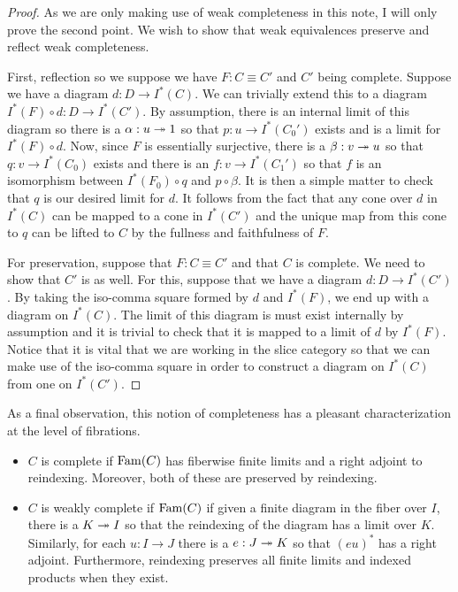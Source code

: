 \begin{proof}
  As we are only making use of weak completeness in this note, I will
  only prove the second point. We wish to show that weak equivalences
  preserve and reflect weak completeness.

  First, reflection so we suppose we have $F : C \equiv C'$ and $C'$
  being complete. Suppose we have a diagram $d : D \to I^*(C)$. We can
  trivially extend this to a diagram $I^*(F) \circ d : D \to I^*(C')$.
  By assumption, there is an internal limit of this diagram so there
  is a $\alpha : u \twoheadrightarrow 1$ so that $p : u \to I^*(C_0')$ exists and is
  a limit for $I^*(F) \circ d$. Now, since $F$ is essentially
  surjective, there is a $\beta : v \twoheadrightarrow u$ so that
  $q : v \to I^*(C_0)$ exists and there is an $f : v \to I^*(C_1')$ so
  that $f$ is an isomorphism between $I^*(F_0) \circ q$ and
  $p \circ \beta$. It is then a simple matter to check that $q$ is our
  desired limit for $d$. It follows from the fact that any cone over
  $d$ in $I^*(C)$ can be mapped to a cone in $I^*(C')$ and the unique
  map from this cone to $q$ can be lifted to $C$ by the fullness and
  faithfulness of $F$.

  For preservation, suppose that $F : C \equiv C'$ and that $C$ is
  complete. We need to show that $C'$ is as well. For this, suppose
  that we have a diagram $d : D \to I^*(C')$. By taking the iso-comma
  square formed by $d$ and $I^*(F)$, we end up with a diagram on
  $I^*(C)$. The limit of this diagram is must exist internally by
  assumption and it is trivial to check that it is mapped to a limit
  of $d$ by $I^*(F)$. Notice that it is vital that we are working in
  the slice category so that we can make use of the iso-comma square
  in order to construct a diagram on $I^*(C)$ from one on $I^*(C')$.
\end{proof}
As a final observation, this notion of completeness has a pleasant
characterization at the level of fibrations.
\begin{defn}\label{defn:complete:completefibration}
  \begin{itemize}
  \item $C$ is complete if $\operatorname{Fam}(C)$ has fiberwise finite limits and a
    right adjoint to reindexing. Moreover, both of these are preserved
    by reindexing.
  \item $C$ is weakly complete if $\operatorname{Fam}(C)$ if given a finite
    diagram in the fiber over $I$, there is a $K \twoheadrightarrow I$ so that the
    reindexing of the diagram has a limit over $K$. Similarly, for
    each $u : I \to J$ there is a $e : J \twoheadrightarrow K$ so that $(eu)^*$ has
    a right adjoint. Furthermore, reindexing preserves all finite
    limits and indexed products when they exist.
  \end{itemize}
\end{defn}

